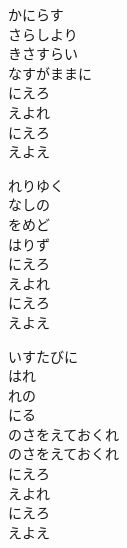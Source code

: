 \documentclass[10pt,b5j]{tarticle} %
\begin{document}
\vspace{1.5em} %
\newcommand{\linespace}{0.5em} %
\newcommand{\blocksize}{0.5\hsize} %
\begin{enumerate} %
    \begin{minipage}[c]{\blocksize}
    
        \vspace{\linespace}
        \item
        かにらす\\
        さらしより\\
        きさすらい\\
        なすがままに\\
        にえろ\\
        えよれ\\
        にえろ\\
        えよえ
        
        \vspace{\linespace}
        \item
        れりゆく\\
        なしの\\
        をめど\\
        はりず\\
        にえろ\\
        えよれ\\
        にえろ\\
        えよえ
        
        \vspace{\linespace}
        \item
        いすたびに\\
        はれ\\
        れの\\
        にる\\
        のさをえておくれ\\
        のさをえておくれ\\
        にえろ\\
        えよれ\\
        にえろ\\
        えよえ
    
    \end{minipage}
\end{enumerate} %
\end{document}
